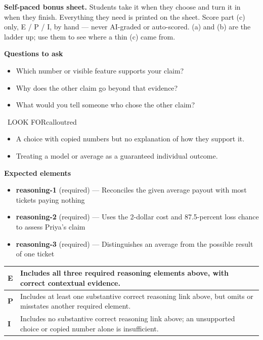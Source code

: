 \documentclass[11pt]{article}
\begin{document}
\textbf{Self-paced bonus sheet.} Students take it when they choose and turn it in when they finish. Everything they need is printed on the sheet. Score part (c) only, E / P / I, by hand --- never AI-graded or auto-scored. (a) and (b) are the ladder up; use them to see where a thin (c) came from.\par

\textbf{Questions to ask}
\begin{itemize}[leftmargin=1.5em,itemsep=2pt,topsep=2pt]
  \item Which number or visible feature supports your claim?
  \item Why does the other claim go beyond that evidence?
  \item What would you tell someone who chose the other claim?
\end{itemize}

\begin{callout}{\IconWarn\ LOOK FOR}{calloutred}
\begin{itemize}[leftmargin=1.5em,itemsep=2pt,topsep=2pt]
  \item A choice with copied numbers but no explanation of how they support it.
  \item Treating a model or average as a guaranteed individual outcome.
\end{itemize}
\end{callout}


\textbf{Expected elements}
\begin{itemize}[leftmargin=1.5em,itemsep=2pt,topsep=2pt]
  \item \textbf{reasoning-1} (required) --- Reconciles the given average payout with most tickets paying nothing
  \item \textbf{reasoning-2} (required) --- Uses the 2-dollar cost and 87.5-percent loss chance to assess Priya's claim
  \item \textbf{reasoning-3} (required) --- Distinguishes an average from the possible result of one ticket
\end{itemize}

{\small\renewcommand{\arraystretch}{1.25}
\noindent\begin{tabular}{|p{0.5in}|p{5.9in}|}
\hline
\textbf{E} & Includes all three required reasoning elements above, with correct contextual evidence. \\ \hline
\textbf{P} & Includes at least one substantive correct reasoning link above, but omits or misstates another required element. \\ \hline
\textbf{I} & Includes no substantive correct reasoning link above; an unsupported choice or copied number alone is insufficient. \\ \hline
\end{tabular}}
\end{document}
